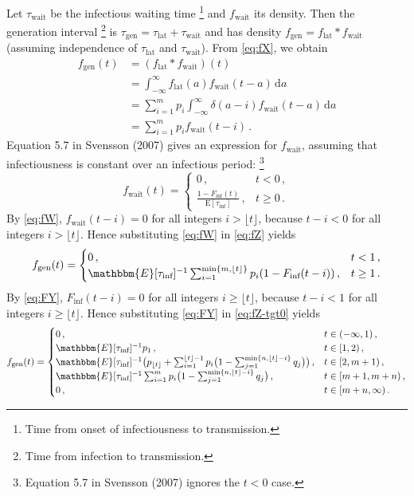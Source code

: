 \documentclass[12pt]{article}
\newcommand{\tlat}{\tau_\text{lat}}
\newcommand{\tinf}{\tau_\text{inf}}
\newcommand{\twait}{\tau_\text{wait}}
\newcommand{\tgen}{\tau_\text{gen}}
\renewcommand{\flat}{f_\text{lat}}
\newcommand{\fwait}{f_\text{wait}}
\newcommand{\fgen}{f_\text{gen}}
\newcommand{\Finf}{F_\text{inf}}
\begin{document}
Let $\twait$ be the infectious waiting time%
\footnote{Time from onset of infectiousness to transmission.}
and $\fwait$ its density. Then the generation interval%
\footnote{Time from infection to transmission.}
is $\tgen = \tlat + \twait$ and has density $\fgen = \flat * \fwait$
(assuming independence of $\tlat$ and $\twait$).
From \eqref{eq:fX}, we obtain
%
\begin{equation}
  \label{eq:fZ}
  \begin{aligned}
    \fgen(t)
    &= (\flat * \fwait)(t) \\
    &= \int_{-\infty}^{\infty} \flat(a) \fwait(t - a)\,\text{d}a \\
    &= \sum_{i=1}^{m} p_i \int_{-\infty}^{\infty} \delta(a - i) \fwait(t - a)\,\text{d}a \\
    &= \sum_{i=1}^{m} p_i \fwait(t - i)\,.
  \end{aligned}
\end{equation}
%
Equation 5.7 in Svensson (2007) gives an expression for $\fwait$,
assuming that infectiousness is constant over an infectious period:%
\footnote{Equation 5.7 in Svensson (2007) ignores the $t < 0$ case.}
%
\begin{equation}
  \label{eq:fW}
  \fwait(t) = \begin{cases} 0\,, & t < 0\,, \\ \frac{1 - \Finf(t)}{\mathrm{E}[\tinf]}\,, & t \geq 0\,. \end{cases}
\end{equation}
%
By \eqref{eq:fW}, $\fwait(t - i) = 0$ for all integers
$i > \lfloor t \rfloor$, because $t - i < 0$ for all
integers $i > \lfloor t \rfloor$. Hence substituting
\eqref{eq:fW} in \eqref{eq:fZ} yields
%
\begin{equation}
  \label{eq:fZ-tgt0}
  \fgen(t) = \begin{cases}
    0\,,
      & t < 1\,, \\
    \mathbbm{E}[\tinf]^{-1} \sum_{i=1}^{\min\{m, \lfloor t \rfloor\}} p_i (1 - \Finf(t - i))\,,
      & t \geq 1\,.
  \end{cases}
\end{equation}
%
By \eqref{eq:FY}, $\Finf(t - i) = 0$ for all integers
$i \geq \lfloor t \rfloor$, because $t - i < 1$ for all
integers $i \geq \lfloor t \rfloor$. Hence substituting
\eqref{eq:FY} in \eqref{eq:fZ-tgt0} yields
%
\begin{equation}
  \fgen(t) = \begin{cases}
    0\,,
      & t \in (-\infty,1)\,, \\
    \mathbbm{E}[\tinf]^{-1} p_1\,,
      & t \in [1,2)\,, \\
    \mathbbm{E}[\tinf]^{-1} \big(p_{\lfloor t \rfloor} + \sum_{i=1}^{\lfloor t \rfloor - 1} p_i \big(1 - \sum_{j=1}^{\min\{n,\lfloor t \rfloor - i\}} q_j\big)\big)\,,
      & t \in [2,m+1)\,, \\
    \mathbbm{E}[\tinf]^{-1} \sum_{i=1}^{m} p_i \big(1 - \sum_{j=1}^{\min\{n,\lfloor t \rfloor - i\}} q_j\big)\,,
      & t \in [m+1,m+n)\,, \\
    0\,,
      & t \in [m+n,\infty)\,.
  \end{cases}
\end{equation}
\end{document}
